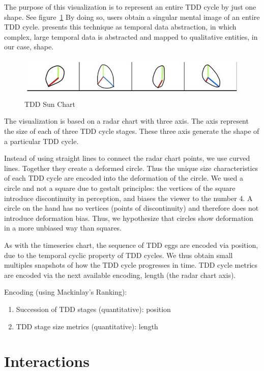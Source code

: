\documentclass[journal]{vgtc}                %
\begin{document}
The purpose of this visualization is to represent an entire TDD cycle by just one shape. 
See figure~\ref{fig:three}
By doing so, users obtain a singular mental image of an entire TDD cycle.
\cite{one} presents this technique as temporal data abstraction, in which complex, large temporal data is abstracted and mapped to qualitative entities, in our case, shape.

\begin{figure}
	\includegraphics[width=\textwidth]{fig3.png}
	\caption{TDD Sun Chart}
	\label{fig:three}
\end{figure}

The visualization is based on a radar chart with three axis. The axis represent the size of each of three TDD cycle stages. These three axis generate the shape of a particular TDD cycle.

Instead of using straight lines to connect the radar chart points, we use curved lines. Together they create a deformed circle. Thus the unique size characteristics of each TDD cycle are encoded into the deformation of the circle. We used a circle and not a square due to gestalt principles: the vertices of the square introduce discontinuity in perception, and biases the viewer to the number 4. A circle on the hand has no vertices (points of discontinuity) and therefore does not introduce deformation bias. Thus, we hypothesize that circles show deformation in a more unbiased way than squares.

As with the timeseries chart, the sequence of TDD eggs are encoded via position, due to the temporal cyclic property of TDD cycles. We thus obtain small multiples snapshots of how the TDD cycle progresses in time.
TDD cycle metrics are encoded via the next available encoding, length (the radar chart axis).

Encoding (using Mackinlay's Ranking):
\begin{enumerate}
	\item Succession of TDD stages (quantitative): position
	\item TDD stage size metrics (quantitative): length
\end{enumerate}

\section{Interactions}
\end{document}
